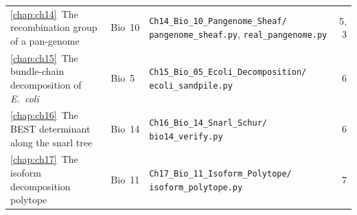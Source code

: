 {\begin{longtable}{>{\raggedright\arraybackslash}p{}l>{\raggedright\arraybackslash}p{}r}
\ref{chap:ch14}\ The recombination group of a pan-genome & Bio~10 & \texttt{Ch14\_Bio\_10\_Pangenome\_Sheaf/} \texttt{pangenome\_sheaf.py}, \texttt{real\_pangenome.py} & 5, 3\\
\ref{chap:ch15}\ The bundle-chain decomposition of \emph{E.~coli} & Bio~5 & \texttt{Ch15\_Bio\_05\_Ecoli\_Decomposition/} \texttt{ecoli\_sandpile.py} & 6\\
\ref{chap:ch16}\ The BEST determinant along the snarl tree & Bio~14 & \texttt{Ch16\_Bio\_14\_Snarl\_Schur/} \texttt{bio14\_verify.py} & 6\\
\ref{chap:ch17}\ The isoform decomposition polytope & Bio~11 & \texttt{Ch17\_Bio\_11\_Isoform\_Polytope/} \texttt{isoform\_polytope.py} & 7\\
\bottomrule
\end{longtable}}
